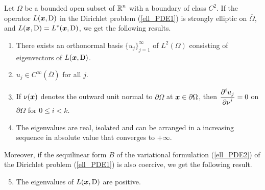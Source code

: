 \begin{theorem}  \label{ell_exist_th4}
Let $\Omega$ be a bounded open subset of $\displaystyle \mathbb{R}^n$ with a
boundary of class $\displaystyle C^2$.  If the operator
$L({\bm{x}},\operatorname{D})$ in the Dirichlet problem
(\ref{ell_PDE1}) is strongly elliptic on $\overline{\Omega}$, and
$\displaystyle L({\bm{x}},\operatorname{D})=L^\ast({\bm{x}},\operatorname{D})$, we get the
following results.
\begin{enumerate}
\item There exists an orthonormal basis $\displaystyle \{u_j\}_{j=1}^\infty$ of
$\displaystyle L^2(\Omega)$ consisting of eigenvectors of $L({\bm{x}},\operatorname{D})$.
\item $\displaystyle u_j \in C^\infty(\overline{\Omega})$ for all $j$.
\item If $\nu({\bm{x}})$ denotes the outward unit normal to
$\partial \Omega$ at ${\bm{x}} \in \partial \Omega$, then
$\displaystyle \frac{\displaystyle \partial^{i}{u_j}} {\displaystyle \partial \nu^{i}}=0$ on $\partial \Omega$
for $0 \leq i < k$.
\item The eigenvalues are real, isolated and can be arranged in a
increasing sequence in absolute value that converges to $+\infty$.
\end{enumerate}
Moreover, if the sequilinear form $B$ of the variational formulation
(\ref{ell_PDE2}) of the Dirichlet problem (\ref{ell_PDE1}) is
also coercive, we get the following result.
\begin{enumerate}
\setcounter{enumi}{4}
\item The eigenvalues of $L({\bm{x}},\operatorname{D})$ are positive.
\end{enumerate}
\end{theorem}

